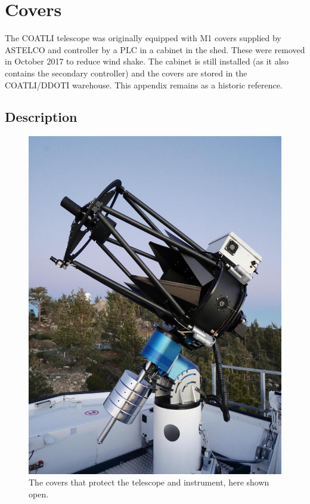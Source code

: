 \chapter{Covers}
\label{chapter:covers}

The COATLI telescope was originally equipped with M1 covers supplied by ASTELCO and controller by a PLC in a cabinet in the shed. These were removed in October 2017 to reduce wind shake. The cabinet is still installed (as it also contains the secondary controller) and the covers are stored in the COATLI/DDOTI warehouse. This appendix remains as a historic reference.

\section{Description}

\begin{figure}
\begin{center}
\includegraphics[width=0.8\linewidth]{figures/covers-open.jpg}
\end{center}
\caption{The covers that protect the telescope and instrument, here shown open.}
\label{figure:covers-open}
\end{figure}

